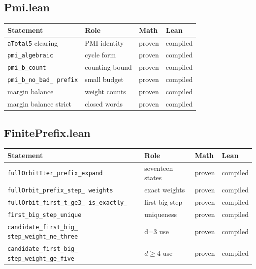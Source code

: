 \subsection{Pmi.lean}

\begin{center}
\small
\begin{tabular}{@{}p{}p{}p{}p{}@{}}
\toprule
Statement & Role & Math & Lean \\
\midrule
\texttt{aTotal5} clearing & PMI identity & proven & compiled \\
\texttt{pmi\_\allowbreak algebraic} & cycle form & proven & compiled \\
\texttt{pmi\_\allowbreak b\_\allowbreak count} & counting bound & proven & compiled \\
\texttt{pmi\_\allowbreak b\_\allowbreak no\_\allowbreak bad\_\allowbreak
prefix} & small budget & proven & compiled \\
margin balance & weight counts & proven & compiled \\
margin balance strict & closed words & proven & compiled \\
\bottomrule
\end{tabular}
\end{center}

\subsection{FinitePrefix.lean}

\begin{center}
\small
\begin{tabular}{@{}p{}p{}p{}p{}@{}}
\toprule
Statement & Role & Math & Lean \\
\midrule
\texttt{fullOrbitIter\_\allowbreak prefix\_\allowbreak expand} &
  seventeen states & proven & compiled \\
\texttt{fullOrbit\_\allowbreak prefix\_\allowbreak step\_\allowbreak
weights} & exact weights & proven & compiled \\
\texttt{fullOrbit\_\allowbreak first\_\allowbreak t\_\allowbreak ge3\_
\allowbreak is\_\allowbreak exactly\_\allowbreak 3} & first big step &
  proven & compiled \\
\texttt{first\_\allowbreak big\_\allowbreak step\_\allowbreak unique} &
  uniqueness & proven & compiled \\
\texttt{candidate\_\allowbreak first\_\allowbreak big\_\allowbreak
step\_\allowbreak weight\_\allowbreak ne\_\allowbreak three} & d=3 use &
  proven & compiled \\
\texttt{candidate\_\allowbreak first\_\allowbreak big\_\allowbreak
step\_\allowbreak weight\_\allowbreak ge\_\allowbreak five} & $d\ge4$ use &
  proven & compiled \\
\bottomrule
\end{tabular}
\end{center}

